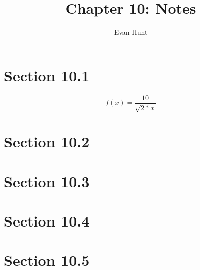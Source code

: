 \documentclass[12pt]{article}
\title{Chapter 10: Notes}
\author{Evan Hunt}
\begin{document}
    \maketitle

    \section[]{Section 10.1}
        \begin{equation}
            f(x) = \frac{10}{\sqrt{2*x}}
        \end{equation}
    \section[]{Section 10.2}
    \section[]{Section 10.3}
    \section[]{Section 10.4}
    \section[]{Section 10.5}
\end{document}
